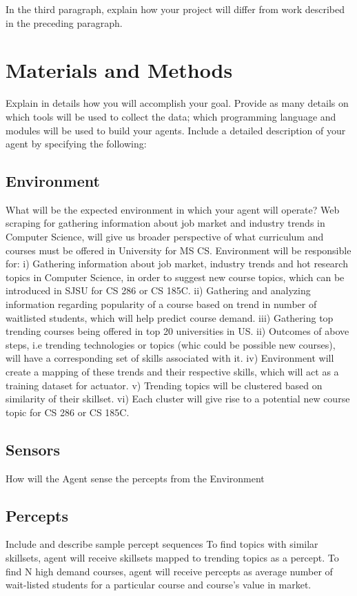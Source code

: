 \documentclass{article}
\begin{document}
In the third paragraph, explain how your project will differ from work described in the preceding paragraph. 

\section{Materials and Methods}
Explain in details how you will accomplish your goal.  Provide as many details on which tools will be used to collect the data; which programming language and modules will be used to build your agents.
Include a detailed description of your agent by specifying the following:
\subsection{Environment}
What will be the expected environment in which your agent will operate?
Web scraping for gathering information about job market and industry trends in Computer Science, will give us broader perspective of what curriculum and courses must be offered in University for MS CS.
Environment will be responsible for:
i)  Gathering information about job market, industry trends and hot research topics in Computer Science, in order to suggest new course topics, which can be introduced in SJSU for CS 286 or CS 185C.
ii) Gathering and analyzing information regarding popularity of a course based on trend in number of waitlisted students, which will help predict course demand.
iii) Gathering top trending courses being offered in top 20 universities in US.
ii) Outcomes of above steps, i.e trending technologies or topics (whic could be possible new courses), will have a corresponding set of skills associated with it.
iv) Environment will create a mapping of these trends and their respective skills, which will act as a training dataset for actuator.
v) Trending topics will be clustered based on similarity of their skillset.
vi) Each cluster will give rise to a potential new course topic for CS 286 or CS 185C. 

\subsection{Sensors}
How will the Agent sense the percepts from the Environment


\subsection{Percepts}
Include and describe sample percept sequences
To find topics with similar skillsets, agent will receive skillsets mapped to trending topics as a percept.
To find N high demand courses, agent will receive percepts as average number of wait-listed students for a particular course and course's value in market.
\end{document}
